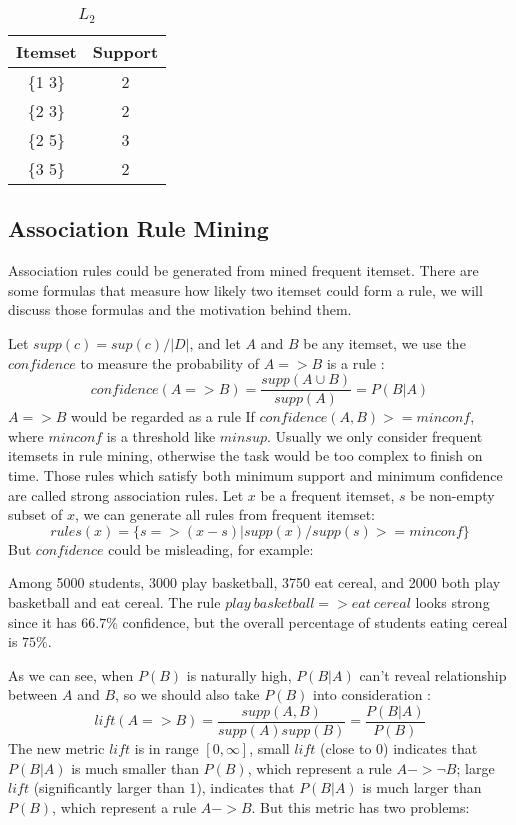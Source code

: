 \documentclass{article}
\begin{document}
\begin{table}[!htb]
    \begin{subtable}{.5\linewidth}
        \caption{$L_2$}
        \begin{tabular}{|c|c|}
            Itemset &  Support\\
            \hline
            \{1 3\} & 2 \\
            \{2 3\} & 2 \\
            \{2 5\} & 3 \\
            \{3 5\} & 2 \\
        \end{tabular}
    \end{subtable}
    \label{table:ap}
\end{table}

\subsection{Association Rule Mining}
Association rules could be generated from mined frequent itemset. There are some formulas that measure how likely two itemset could form a rule, we will discuss those formulas and the motivation behind them.

Let $supp(c) = sup(c)/|D|$, and let $A$ and $B$ be any itemset, we use the $confidence$ to measure the probability of $A=>B$ is a rule \cite{hipp2000algorithms}:
$$
    confidence(A => B) = \frac{supp(A \cup B)}{supp (A)} = P(B|A)
$$
$A=>B$ would be regarded as a rule If $confidence(A,B) >= minconf$, where $minconf$ is a threshold like $minsup$. Usually we only consider frequent itemsets in rule mining, otherwise the task would be too complex to finish on time. Those rules which satisfy both minimum support and minimum confidence are called strong association rules. Let $x$ be a frequent itemset, $s$ be non-empty subset of $x$, we can generate all rules from frequent itemset:
$$
    rules(x) = \{s=>(x-s) | supp(x) / supp(s) >= minconf\}
$$
But $confidence$ could be misleading, for example:

Among 5000 students, 3000 play basketball, 3750 eat cereal, and 2000 both play basketball and eat cereal. The rule $play\ basketball => eat\ cereal$ looks strong since it has $66.7\%$ confidence, but the overall percentage of students eating cereal is $75\%$\cite{aggarwal1998new}. 

As we can see, when $P(B)$ is naturally high, $P(B|A)$ can't reveal relationship between $A$ and $B$, so we should also take $P(B)$ into consideration \cite{brin1997dynamic}:
$$
    lift(A=>B) = \frac{supp(A,B)}{supp(A)supp(B)} = \frac{P(B|A)}{P(B)}
$$
The new metric $lift$ is in range $[0, \infty]$, small $lift$ (close to $0$) indicates that $P(B|A)$ is much smaller than $P(B)$, which represent a rule $A -> \lnot B$; large $lift$ (significantly larger than $1$), indicates that $P(B|A)$ is much larger than $P(B)$, which represent a rule $A -> B$. But this metric has two problems:
\end{document}
